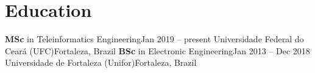 \section{Education}
  \resumeSubHeadingListStart
    \resumeSubheading
      {\textbf{MSc} in Teleinformatics Engineering}{Jan 2019 -- present}
      {Universidade Federal do Ceará (UFC)}{Fortaleza, Brazil}
    \resumeSubheading
      {\textbf{BSc} in Electronic Engineering}{Jan 2013 -- Dec 2018}
      {Universidade de Fortaleza (Unifor)}{Fortaleza, Brazil}
  \resumeSubHeadingListEnd